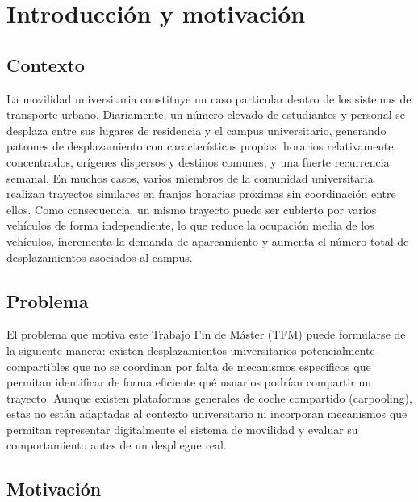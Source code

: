 
\chapter{Introducción y motivación}
\label{ch:introduccion}

\section{Contexto}

La movilidad universitaria constituye un caso particular dentro de los sistemas de transporte urbano. Diariamente, un número elevado de estudiantes y personal se desplaza entre sus lugares de residencia y el campus universitario, generando patrones de desplazamiento con características propias: horarios relativamente concentrados, orígenes dispersos y destinos comunes, y una fuerte recurrencia semanal. En muchos casos, varios miembros de la comunidad universitaria realizan trayectos similares en franjas horarias próximas sin coordinación entre ellos. Como consecuencia, un mismo trayecto puede ser cubierto por varios vehículos de forma independiente, lo que reduce la ocupación media de los vehículos, incrementa la demanda de aparcamiento y aumenta el número total de desplazamientos asociados al campus.

\section{Problema}

El problema que motiva este Trabajo Fin de Máster (TFM) puede formularse de la siguiente manera: existen desplazamientos universitarios potencialmente compartibles que no se coordinan por falta de mecanismos específicos que permitan identificar de forma eficiente qué usuarios podrían compartir un trayecto. Aunque existen plataformas generales de coche compartido (carpooling), estas no están adaptadas al contexto universitario ni incorporan mecanismos que permitan representar digitalmente el sistema de movilidad y evaluar su comportamiento antes de un despliegue real.

\section{Motivación}

